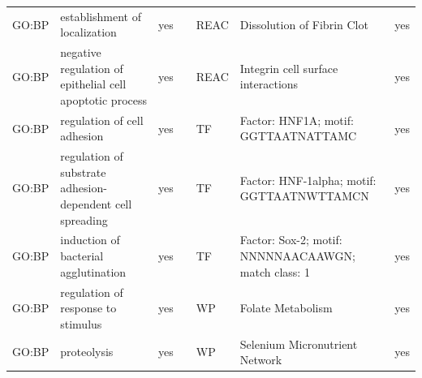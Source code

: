 \begin{longtable}{@{}lp{4cm}lllp{4cm}l@{}}
GO:BP           & establishment of localization                                                                                                      & yes              &           & REAC            & Dissolution of Fibrin Clot                                                                                                                                             & yes              \\
GO:BP           & negative regulation of epithelial cell apoptotic process                                                                           & yes              &           & REAC            & Integrin cell surface interactions                                                                                                                                     & yes              \\
GO:BP           & regulation of cell adhesion                                                                                                        & yes              &           & TF              & Factor: HNF1A; motif: GGTTAATNATTAMC                                                                                                                                   & yes              \\
GO:BP           & regulation of substrate adhesion-dependent cell spreading                                                                          & yes              &           & TF              & Factor: HNF-1alpha; motif: GGTTAATNWTTAMCN                                                                                                                             & yes              \\
GO:BP           & induction of bacterial agglutination                                                                                               & yes              &           & TF              & Factor: Sox-2; motif: NNNNNAACAAWGN; match class: 1                                                                                                                    & yes              \\
GO:BP           & regulation of response to stimulus                                                                                                 & yes              &           & WP              & Folate Metabolism                                                                                                                                                      & yes              \\
GO:BP           & proteolysis                                                                                                                        & yes              &           & WP              & Selenium Micronutrient Network                                                                                                                                         & yes              \\

\end{longtable}
